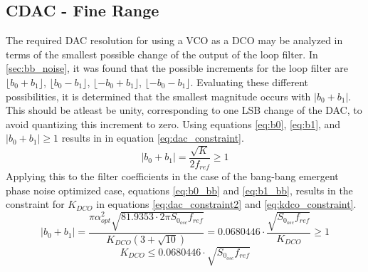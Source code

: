 
	\FloatBarrier
	\subsection{CDAC - Fine Range}
	The required DAC resolution for using a VCO as a DCO may be analyzed in terms of the smallest possible change of the output of the loop filter. In \ref{sec:bb_noise}, it was found that the possible increments for the loop filter are $\lfloor b_0+b_1 \rfloor$, $\lfloor b_0-b_1 \rfloor$, $\lfloor -b_0+b_1 \rfloor$, $\lfloor -b_0-b_1 \rfloor$. Evaluating these different possibilities, it is determined that the smallest magnitude occurs with $|b_0+b_1|$. This should be atleast be unity, corresponding to one LSB change of the DAC, to avoid quantizing this increment to zero. Using equations \ref{eq:b0}, \ref{eq:b1}, and  $|b_0+b_1| \geq 1$ results in in equation \ref{eq:dac_constraint}.
	\begin{equation}\label{eq:dac_constraint}
		|b_0+b_1| = \frac{\sqrt{K}}{2f_{ref}} \geq 1
	\end{equation}
	Applying this to the filter coefficients in the case of the bang-bang emergent phase noise optimized case, equations \ref{eq:b0_bb} and \ref{eq:b1_bb}, results in the constraint for $K_{DCO}$ in equations  \ref{eq:dac_constraint2} and \ref{eq:kdco_constraint}.
	\begin{equation}\label{eq:dac_constraint2}
		|b_0+b_1| = \frac{\pi\alpha_{opt}^2\sqrt{81.9353\cdot2\pi S_{0_{osc}} f_{ref}}}{K_{DCO}(3+\sqrt{10})} = 0.0680446\cdot \frac{ \sqrt{S_{0_{osc}} f_{ref}}}{K_{DCO}} \geq 1
	\end{equation}
	\begin{equation}\label{eq:kdco_constraint}
		K_{DCO} \leq 0.0680446\cdot \sqrt{S_{0_{osc}} f_{ref}}
	\end{equation}

